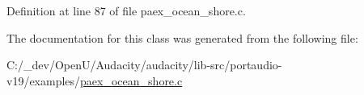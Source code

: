 Definition at line 87 of file paex\+\_\+ocean\+\_\+shore.\+c.



The documentation for this class was generated from the following file\+:\begin{DoxyCompactItemize}
\item 
C\+:/\+\_\+dev/\+Open\+U/\+Audacity/audacity/lib-\/src/portaudio-\/v19/examples/\hyperlink{paex__ocean__shore_8c}{paex\+\_\+ocean\+\_\+shore.\+c}\end{DoxyCompactItemize}
